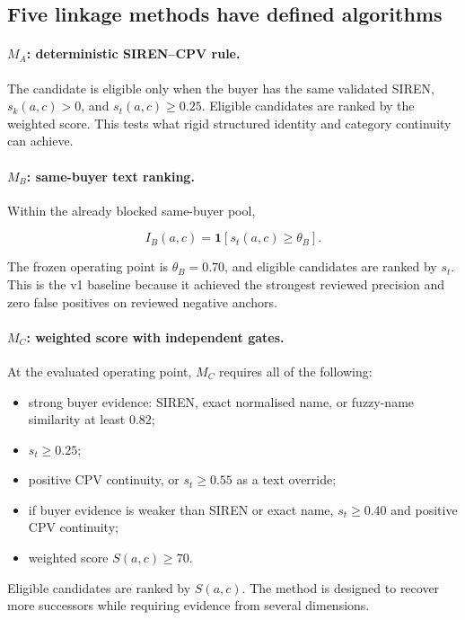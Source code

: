 \documentclass[11pt,a4paper]{article}
\begin{document}
\subsection{Five linkage methods have defined algorithms}

\paragraph{$M_A$: deterministic SIREN--CPV rule.}
The candidate is eligible only when the buyer has the same validated SIREN,
$s_k(a,c)>0$, and $s_t(a,c)\ge0.25$. Eligible candidates are ranked by the weighted
score. This tests what rigid structured identity and category continuity can achieve.

\paragraph{$M_B$: same-buyer text ranking.}
Within the already blocked same-buyer pool,

\begin{equation}
I_B(a,c)=\mathbf{1}[s_t(a,c)\ge\theta_B].
\end{equation}

The frozen operating point is $\theta_B=0.70$, and eligible candidates are ranked by
$s_t$. This is the v1 baseline because it achieved the strongest reviewed precision
and zero false positives on reviewed negative anchors.

\paragraph{$M_C$: weighted score with independent gates.}
At the evaluated operating point, $M_C$ requires all of the following:

\begin{itemize}
  \item strong buyer evidence: SIREN, exact normalised name, or fuzzy-name similarity
  at least 0.82;
  \item $s_t\ge0.25$;
  \item positive CPV continuity, or $s_t\ge0.55$ as a text override;
  \item if buyer evidence is weaker than SIREN or exact name, $s_t\ge0.40$ and
  positive CPV continuity;
  \item weighted score $S(a,c)\ge70$.
\end{itemize}

Eligible candidates are ranked by $S(a,c)$. The method is designed to recover more
successors while requiring evidence from several dimensions.
\end{document}

